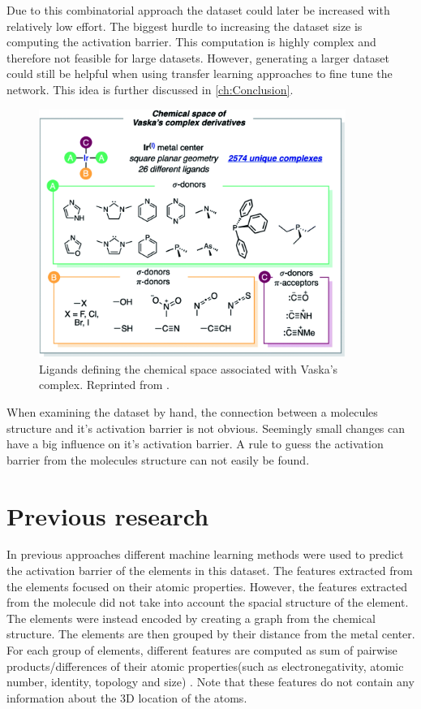 Due to this combinatorial approach the dataset could later be increased with relatively low effort.
The biggest hurdle to increasing the dataset size is computing the activation barrier.
This computation is highly complex and therefore not feasible for large datasets.
However, generating a larger dataset could still be helpful when using transfer learning approaches to fine tune the network.
This idea is further discussed in \ref{ch:Conclusion}.

\begin{figure}
  \centering
  \includegraphics[width=10cm]{figures/introduction/chem-space.png}
  \caption{Ligands defining the chemical space associated with Vaska's complex. Reprinted from \cite{friederich_dos}.}
  \label{fig:chemspace}
\end{figure}

When examining the dataset by hand, the connection between a molecules structure and it's activation barrier is not obvious.
Seemingly small changes can have a big influence on it's activation barrier.
A rule to guess the activation barrier from the molecules structure can not easily be found.  

\section{Previous research}

In previous approaches different machine learning methods were used to predict the activation barrier of the elements in this dataset.
The features extracted from the elements focused on their atomic properties.
However, the features extracted from the molecule did not take into account the spacial structure of the element.
The elements were instead encoded by creating a graph from the chemical structure.
The elements are then grouped by their distance from the metal center.
For each group of elements, different features are computed as sum of pairwise products/differences of their atomic properties(such as electronegativity, atomic number, identity, topology and size) \cite{friederich_dos}.
Note that these features do not contain any information about the 3D location of the atoms.

